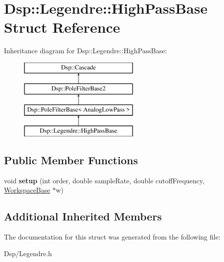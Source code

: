 \hypertarget{structDsp_1_1Legendre_1_1HighPassBase}{\section{Dsp\-:\-:Legendre\-:\-:High\-Pass\-Base Struct Reference}
\label{structDsp_1_1Legendre_1_1HighPassBase}
}
Inheritance diagram for Dsp\-:\-:Legendre\-:\-:High\-Pass\-Base\-:\begin{figure}[H]
\begin{center}
\leavevmode
\includegraphics[height=4.000000cm]{structDsp_1_1Legendre_1_1HighPassBase}
\end{center}
\end{figure}
\subsection*{Public Member Functions}
\begin{DoxyCompactItemize}
\item 
\hypertarget{structDsp_1_1Legendre_1_1HighPassBase_ac28d5168cf2ce43bca50c904796e4a3d}{void {\bfseries setup} (int order, double sample\-Rate, double cutoff\-Frequency, \hyperlink{structDsp_1_1Legendre_1_1WorkspaceBase}{Workspace\-Base} $\ast$w)}\label{structDsp_1_1Legendre_1_1HighPassBase_ac28d5168cf2ce43bca50c904796e4a3d}

\end{DoxyCompactItemize}
\subsection*{Additional Inherited Members}


The documentation for this struct was generated from the following file\-:\begin{DoxyCompactItemize}
\item 
Dsp/Legendre.\-h\end{DoxyCompactItemize}
